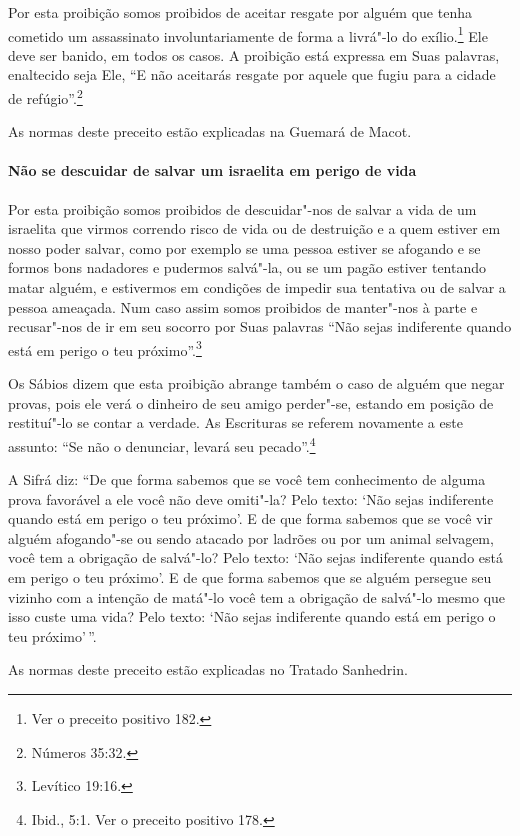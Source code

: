 \begin{multicols}{2}
Por esta proibição somos proibidos de aceitar resgate por alguém que
tenha cometido um assassinato involuntariamente de forma a livrá"-lo do
exílio.\footnote{Ver o preceito positivo 182.} Ele deve ser banido, em todos os casos. A
proibição está expressa em Suas palavras, enaltecido seja Ele, ``E não
aceitarás resgate por aquele que fugiu para a cidade de refúgio''.\footnote{Números 35:32.}

As normas deste preceito estão explicadas na Guemará\starr{} de Macot\starr.

\paragraph{Não se descuidar de salvar um israelita em perigo de vida}

Por esta proibição somos proibidos de descuidar"-nos de salvar a vida de
um israelita que virmos correndo risco de vida ou de destruição e a quem
estiver em nosso poder salvar, como por exemplo se uma pessoa estiver se
afogando e se formos bons nadadores e pudermos salvá"-la, ou se um pagão
estiver tentando matar alguém, e estivermos em condições de impedir sua
tentativa ou de salvar a pessoa ameaçada. Num caso assim somos proibidos
de manter"-nos à parte e recusar"-nos de ir em seu socorro por Suas
palavras ``Não sejas indiferente quando está em perigo o teu próximo''.\footnote{Levítico 19:16.}

Os Sábios dizem que esta proibição abrange também o caso de alguém que
negar provas, pois ele verá o dinheiro de seu amigo perder"-se, estando
em posição de restituí"-lo se contar a verdade. As Escrituras se referem
novamente a este assunto: ``Se não o denunciar, levará seu pecado''.\footnote{Ibid., 5:1. Ver o preceito positivo 178.}

A Sifrá\starr{} diz: ``De que forma sabemos que se você tem conhecimento de
alguma prova favorável a ele você não deve omiti"-la? Pelo texto: `Não
sejas indiferente quando está em perigo o teu próximo'. E de que forma
sabemos que se você vir alguém afogando"-se ou sendo atacado por ladrões
ou por um animal selvagem, você tem a obrigação de salvá"-lo? Pelo texto:
`Não sejas indiferente quando está em perigo o teu próximo'. E de que
forma sabemos que se alguém persegue seu vizinho com a intenção de
matá"-lo você tem a obrigação de salvá"-lo mesmo que isso custe uma vida?
Pelo texto: `Não sejas indiferente quando está em perigo o teu
próximo'\,''.

As normas deste preceito estão explicadas no Tratado Sanhedrin\starr.


\end{multicols}

